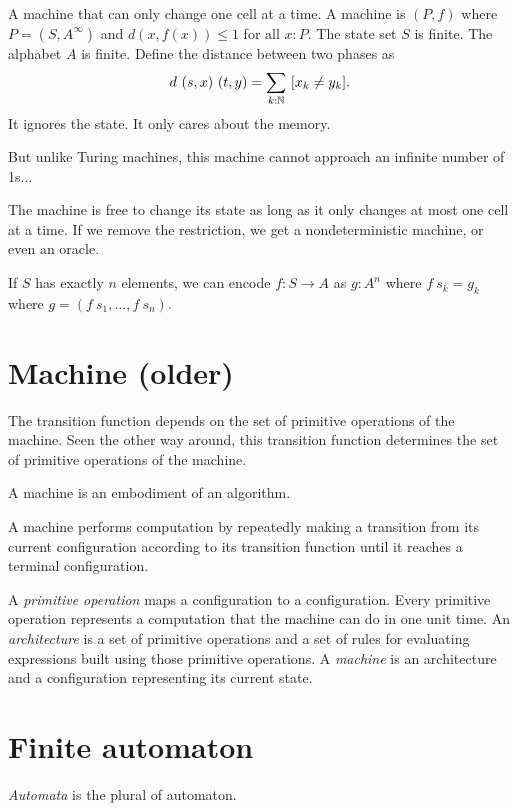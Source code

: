 A machine that can only change one cell at a time.
A machine is
\((P, f)\)
where \(P = (S,A^\infty)\)
and
\(d(x,f(x)) \le 1\)
for all \(x : P\).
The state set \(S\) is finite.
The alphabet \(A\) is finite.
Define the distance between two phases as
\begin{align}
    d~(s,x)~(t,y) = \sum_{k : \mathbb{N}} ~ [x_k \neq y_k].
\end{align}
It ignores the state.
It only cares about the memory.

But unlike Turing machines, this machine cannot approach an infinite number of 1s...

The machine is free to change its state as long as it only changes at most one cell at a time.
If we remove the restriction, we get a nondeterministic machine,
or even an oracle.

If \(S\) has exactly \(n\) elements,
we can encode \(f : S \to A\) as \(g : A^n\)
where \(f~s_k = g_k\) where \(g = (f~s_1, \ldots, f~s_n)\).

\section{Machine (older)}

The transition function depends on the set of primitive operations of the machine.
Seen the other way around, this transition function
determines the set of primitive operations of the machine.

A machine is an embodiment of an algorithm.

A machine performs computation by repeatedly
making a transition from its current configuration
according to its transition function
until it reaches a terminal configuration.

A \emph{primitive operation} maps a configuration to a configuration.
Every primitive operation represents a computation that the machine can do in one unit time.
An \emph{architecture} is a set of primitive operations
and a set of rules for evaluating expressions built using those primitive operations.
A \emph{machine} is an architecture and a configuration representing its current state.

\section{Finite automaton}

\emph{Automata} is the plural of automaton.


